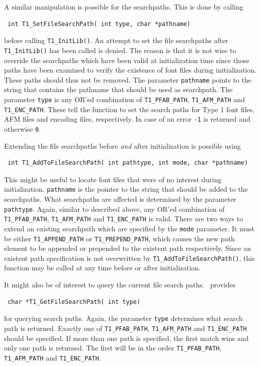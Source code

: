 A similar manipulation is possible for the searchpaths. This is done by
calling 
\precorr
\begin{verbatim}
 int T1_SetFileSearchPath( int type, char *pathname)
\end{verbatim}\postcorr
before calling \verb+T1_InitLib()+. An attempt to set the file searchpaths
after \verb+T1_InitLib()+ has been called is denied. The reason is that it is
not wise to override the searchpaths which have been valid at initialization
time since those paths have been examined to verify the existence of font files
during initialization. These paths should thus not be removed. 
The parameter \verb+pathname+ points to the string that contains the pathname
that should be used as searchpath. The parameter \verb+type+ is any
OR'ed combination of \verb+T1_PFAB_PATH+, \verb+T1_AFM_PATH+ and
\verb+T1_ENC_PATH+. These tell the function to set the search paths for Type 1
font files, AFM files and encoding files, respectively. In case of an error
\verb+-1+ is returned and otherwise \verb+0+.

Extending the file searchpaths before {\em and} after initialization
is possible using 
\precorr
\begin{verbatim}
 int T1_AddToFileSearchPath( int pathtype, int mode, char *pathname)
\end{verbatim}\postcorr
This might be useful to locate font files that were of no interest
during initialization. 
\verb+pathname+ is the pointer to the string that should be added to the
searchpaths. What searchpaths are affected is determined by the parameter
\verb+pathtype+. Again, similar to described above, any
OR'ed combination of \verb+T1_PFAB_PATH+, \verb+T1_AFM_PATH+ and
\verb+T1_ENC_PATH+ is valid. There are two ways to extend an existing
searchpath which are specified by the \verb+mode+ parameter. It must be either
\verb+T1_APPEND_PATH+ or \verb+T1_PREPEND_PATH+, which causes the new path
element to be appended or prepended to the existent path respectively.
Since an existent path specification is not overwritten by
\verb+T1_AddToFileSearchPath()+, this function may be called at any time
before or after initialization.

It might also be of interest to query the current file search
paths. \tonelib\ provides 
\precorr
\begin{verbatim}
 char *T1_GetFileSearchPath( int type)
\end{verbatim}\postcorr 
for querying search paths. Again, the parameter \verb+type+ determines
what search path is returned. Exactly one of \verb+T1_PFAB_PATH+,
\verb+T1_AFM_PATH+ and \verb+T1_ENC_PATH+ should be specified. If more
than one path is specified, the first match wins and only one path is
returned. The first will be in the order \verb+T1_PFAB_PATH+,
\verb+T1_AFM_PATH+ and \verb+T1_ENC_PATH+. 


